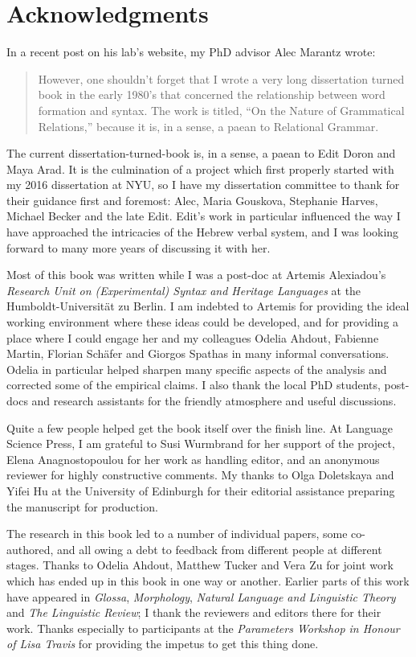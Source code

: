 \chapter*{Acknowledgments}

In a recent post on his lab's website, my PhD advisor Alec Marantz wrote:
\begin{quote}
	However, one shouldn't forget that I wrote a very long dissertation turned book in the early 1980's that concerned the relationship between word formation and syntax. The work is titled, ``On the Nature of Grammatical Relations,'' because it is, in a sense, a paean to Relational Grammar.
\end{quote}
The current dissertation-turned-book is, in a sense, a paean to Edit Doron and Maya Arad. It is the culmination of a project which first properly started with my 2016 dissertation at NYU, so I have my dissertation committee to thank for their guidance first and foremost: Alec, Maria Gouskova, Stephanie Harves, Michael Becker and the late Edit. Edit's work in particular influenced the way I have approached the intricacies of the Hebrew verbal system, and I was looking forward to many more years of discussing it with her.

Most of this book was written while I was a post-doc at Artemis Alexiadou's \emph{Research Unit on (Experimental) Syntax and Heritage Languages} at the Humboldt-Universit\"at zu Berlin. I am indebted to Artemis for providing the ideal working environment where these ideas could be developed, and for providing a place where I could engage her and my colleagues Odelia Ahdout, Fabienne Martin, Florian Sch\"afer and Giorgos Spathas in many informal conversations. Odelia in particular helped sharpen many specific aspects of the analysis and corrected some of the empirical claims. I also thank the local PhD students, post-docs and research assistants for the friendly atmosphere and useful discussions.

Quite a few people helped get the book itself over the finish line. At Language Science Press, I am grateful to Susi Wurmbrand for her support of the project, Elena Anagnostopoulou for her work as handling editor, and an anonymous reviewer for highly constructive comments. My thanks to Olga Doletskaya and Yifei Hu at the University of Edinburgh for their editorial assistance preparing the manuscript for production.

The research in this book led to a number of individual papers, some co-authored, and all owing a debt to feedback from different people at different stages. Thanks to Odelia Ahdout, Matthew Tucker and Vera Zu for joint work which has ended up in this book in one way or another. Earlier parts of this work have appeared in \emph{Glossa}, \emph{Morphology}, \emph{Natural Language and Linguistic Theory} and \emph{The Linguistic Review}; I thank the reviewers and editors there for their work. Thanks especially to participants at the \emph{Parameters Workshop in Honour of Lisa Travis} for providing the impetus to get this thing done.

